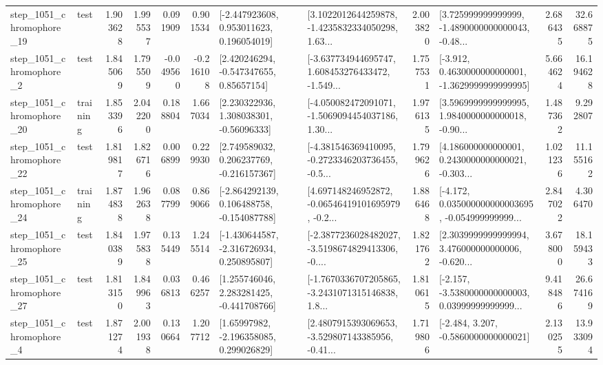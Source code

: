 \begin{tabular}{llrrrrllrlrr}
 step\_1051\_chromophore\_19 &      test &      1.903628 &    1.995537 &      0.091909 &  0.901534 &    [-2.447923608, 0.953011623, 0.196054019] &  [3.1022012644259878, -1.4235832334050298, 1.63... &       2.003820 &  [3.725999999999999, -1.4890000000000043, -0.48... &            2.686435 &         32.668875 \\
  step\_1051\_chromophore\_2 &      test &      1.845069 &    1.795509 &     -0.049560 & -0.216108 &     [2.420246294, -0.547347655, 0.85657154] &  [-3.637734944695747, 1.608453276433472, -1.549... &       1.757531 &  [-3.912, 0.4630000000000001, -1.3629999999999995] &            5.664624 &         16.194628 \\
 step\_1051\_chromophore\_20 &  training &      1.853396 &    2.042200 &      0.188804 &  1.667034 &     [2.230322936, 1.308038301, -0.56096333] &  [-4.050082472091071, -1.5069094454037186, 1.30... &       1.976135 &  [3.5969999999999995, 1.9840000000000018, -0.90... &            1.487362 &          9.292807 \\
 step\_1051\_chromophore\_22 &      test &      1.819817 &    1.826716 &      0.006899 &  0.229930 &    [2.749589032, 0.206237769, -0.216157367] &  [-4.381546369410095, -0.2723346203736455, -0.5... &       1.799626 &  [4.186000000000001, 0.2430000000000021, -0.303... &            1.021236 &         11.155162 \\
 step\_1051\_chromophore\_24 &  training &      1.874838 &    1.962638 &      0.087799 &  0.869066 &   [-2.864292139, 0.106488758, -0.154087788] &  [4.697148246952872, -0.06546419101695979, -0.2... &       1.886468 &  [-4.172, 0.035000000000003695, -0.054999999999... &            2.847022 &          4.306470 \\
 step\_1051\_chromophore\_25 &      test &      1.840389 &    1.975838 &      0.135449 &  1.245514 &   [-1.430644587, -2.316726934, 0.250895807] &  [-2.3877236028482027, -3.5198674829413306, -0.... &       1.821762 &  [2.3039999999999994, 3.476000000000006, -0.620... &            3.678000 &         18.159433 \\
 step\_1051\_chromophore\_27 &      test &      1.813150 &    1.849963 &      0.036813 &  0.466257 &    [1.255746046, 2.283281425, -0.441708766] &  [-1.7670336707205865, -3.2431071315146838, 1.8... &       1.810615 &  [-2.157, -3.5380000000000003, 0.03999999999999... &            9.418486 &         26.674169 \\
  step\_1051\_chromophore\_4 &      test &      1.871274 &    2.001938 &      0.130664 &  1.207712 &     [1.65997982, -2.196358085, 0.299026829] &  [2.4807915393069653, -3.529807143385956, -0.41... &       1.719806 &               [-2.484, 3.207, -0.5860000000000021] &            2.130255 &         13.933094 \\

\end{tabular}
